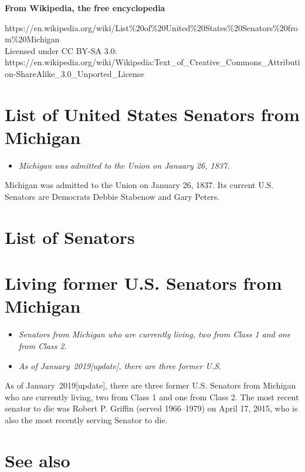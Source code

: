 \textbf{From Wikipedia, the free encyclopedia}

https://en.wikipedia.org/wiki/List\%20of\%20United\%20States\%20Senators\%20from\%20Michigan\\
Licensed under CC BY-SA 3.0:\\
https://en.wikipedia.org/wiki/Wikipedia:Text\_of\_Creative\_Commons\_Attribution-ShareAlike\_3.0\_Unported\_License

\section{List of United States Senators from
Michigan}\label{list-of-united-states-senators-from-michigan}

\begin{itemize}
\item
  \emph{Michigan was admitted to the Union on January 26, 1837.}
\end{itemize}

Michigan was admitted to the Union on January 26, 1837. Its current U.S.
Senators are Democrats Debbie Stabenow and Gary Peters.

\section{List of Senators}\label{list-of-senators}

\section{Living former U.S. Senators from
Michigan}\label{living-former-u.s.-senators-from-michigan}

\begin{itemize}
\item
  \emph{Senators from Michigan who are currently living, two from Class
  1 and one from Class 2.}
\item
  \emph{As of January~2019{[}update{]}, there are three former U.S.}
\end{itemize}

As of January~2019{[}update{]}, there are three former U.S. Senators
from Michigan who are currently living, two from Class 1 and one from
Class 2. The most recent senator to die was Robert P. Griffin (served
1966--1979) on April 17, 2015, who is also the most recently serving
Senator to die.

\section{See also}\label{see-also}

